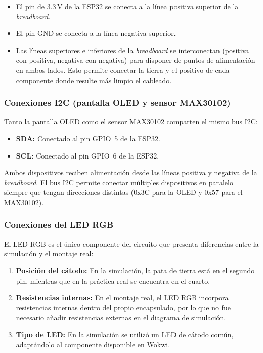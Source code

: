 \documentclass[11pt,a4paper]{article}
\begin{document}
\begin{itemize}
    \item El pin de 3.3\,V de la ESP32 se conecta a la línea positiva superior de la \textit{breadboard}.
    \item El pin GND se conecta a la línea negativa superior.
    \item Las líneas superiores e inferiores de la \textit{breadboard} se interconectan (positiva con positiva, negativa con negativa) para disponer de puntos de alimentación en ambos lados. Esto permite conectar la tierra y el positivo de cada componente donde resulte más limpio el cableado.
\end{itemize}

\subsubsection{Conexiones I2C (pantalla OLED y sensor MAX30102)}

Tanto la pantalla OLED como el sensor MAX30102 comparten el mismo bus I2C:

\begin{itemize}
    \item \textbf{SDA:} Conectado al pin GPIO~5 de la ESP32.
    \item \textbf{SCL:} Conectado al pin GPIO~6 de la ESP32.
\end{itemize}

Ambos dispositivos reciben alimentación desde las líneas positiva y negativa de la \textit{breadboard}. El bus I2C permite conectar múltiples dispositivos en paralelo siempre que tengan direcciones distintas (0x3C para la OLED y 0x57 para el MAX30102).

\subsubsection{Conexiones del LED RGB}

El LED RGB es el único componente del circuito que presenta diferencias entre la simulación y el montaje real:

\begin{enumerate}
    \item \textbf{Posición del cátodo:} En la simulación, la pata de tierra está en el segundo pin, mientras que en la práctica real se encuentra en el cuarto.
    \item \textbf{Resistencias internas:} En el montaje real, el LED RGB incorpora resistencias internas dentro del propio encapsulado, por lo que no fue necesario añadir resistencias externas en el diagrama de simulación.
    \item \textbf{Tipo de LED:} En la simulación se utilizó un LED de cátodo común, adaptándolo al componente disponible en Wokwi.
\end{enumerate}
\end{document}
